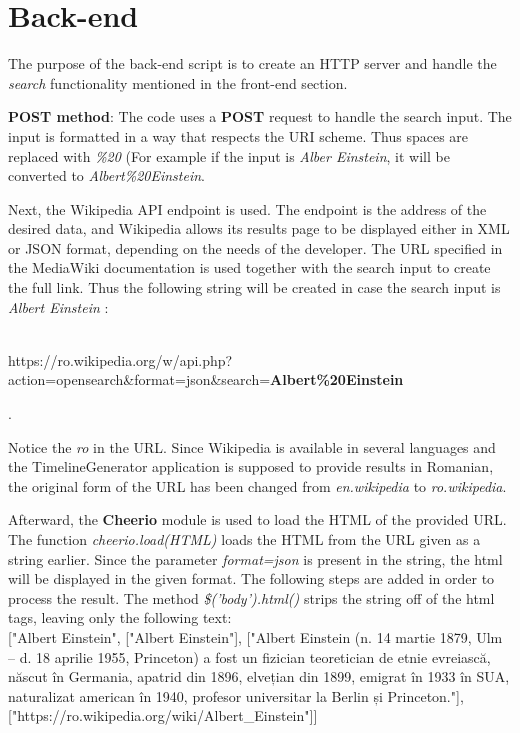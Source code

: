 \documentclass{report}
\begin{document}
\section {Back-end}
The purpose of the back-end script is to create an HTTP server and handle the \textit{search} functionality mentioned in the front-end section.\par

\textbf{POST method}: The code uses a \textbf{POST} request to handle the search input. The input is formatted in a way that respects the URI scheme. Thus spaces are replaced with \textit{\%20} (For example if the input is \textit{Alber Einstein}, it will be converted to \textit{Albert\%20Einstein}. \par

Next, the Wikipedia API endpoint is used. The endpoint is the address of the desired data, and Wikipedia allows its results page to be displayed either in XML or JSON format, depending on the needs of the developer. The URL specified in the MediaWiki documentation is used together with the search input to create the full link. Thus the following string will be created in case the search input is \textit{Albert Einstein} :\\\\\centerline{https://ro.wikipedia.org/w/api.php?action=opensearch\&format=json\&search=\textbf{Albert\%20Einstein}}.\par Notice the \textit{ro} in the URL. Since Wikipedia is available in several languages and the TimelineGenerator application is supposed to provide results in Romanian, the original form of the URL has been changed from \textit{en.wikipedia} to \textit{ro.wikipedia}.

Afterward, the \textbf{Cheerio} module is used to load the HTML of the provided URL. The function \textit{cheerio.load(HTML)} loads the HTML from the URL given as a string earlier. Since the parameter \textit{format=json} is present in the string, the html will be displayed in the given format. The following steps are added in order to process the result. The method \textit{\$('body').html()} strips the string off of the html tags, leaving only the following text:\\

    ["Albert Einstein",
    ["Albert Einstein"],
    ["Albert Einstein (n. 14 martie 1879, Ulm – d. 18 aprilie 1955, Princeton) a fost un fizician teoretician de etnie evreiască, născut în Germania, apatrid din 1896, elvețian din 1899, emigrat în 1933 în SUA, naturalizat american în 1940, profesor universitar la Berlin și Princeton."],
    ["https://ro.wikipedia.org/wiki/Albert\_Einstein"]]\par
\end{document}
